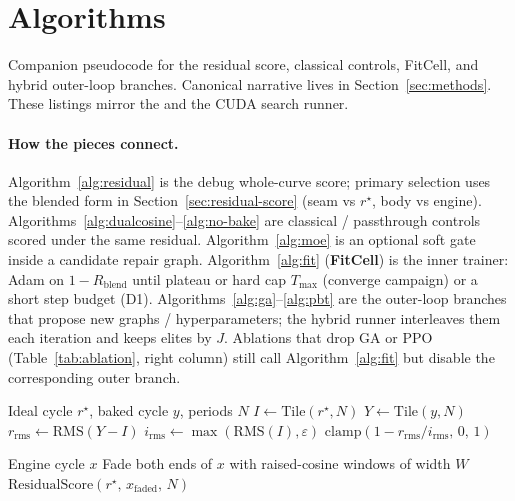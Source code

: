 \section{Algorithms}
\label{app:algorithms}

Companion pseudocode for the residual score, classical controls, FitCell, and hybrid outer-loop branches.
Canonical narrative lives in Section~\ref{sec:methods}.
These listings mirror the
and the CUDA search runner.

\paragraph{How the pieces connect.}
Algorithm~\ref{alg:residual} is the debug whole-curve score; primary selection uses the blended form in Section~\ref{sec:residual-score} (seam vs $r^{\star}$, body vs engine).
Algorithms~\ref{alg:dualcosine}--\ref{alg:no-bake} are classical / passthrough controls scored under the same residual.
Algorithm~\ref{alg:moe} is an optional soft gate inside a candidate repair graph.
Algorithm~\ref{alg:fit} (\textbf{FitCell}) is the inner trainer: Adam on $1-R_{\mathrm{blend}}$ until plateau or hard cap $T_{\max}$ (converge campaign) or a short step budget (D1).
Algorithms~\ref{alg:ga}--\ref{alg:pbt} are the outer-loop branches that propose new graphs / hyperparameters; the hybrid runner interleaves them each iteration and keeps elites by $J$.
Ablations that drop GA or PPO (Table~\ref{tab:ablation}, right column) still call Algorithm~\ref{alg:fit} but disable the corresponding outer branch.

\begin{algorithm}[H]
\caption{ResidualScore}
\label{alg:residual}
\begin{algorithmic}[1]
\Require Ideal cycle $r^{\star}$, baked cycle $y$, periods $N$
\State $I \gets \mathrm{Tile}(r^{\star}, N)$
\State $Y \gets \mathrm{Tile}(y, N)$
\State $r_{\mathrm{rms}} \gets \mathrm{RMS}(Y-I)$
\State $i_{\mathrm{rms}} \gets \max(\mathrm{RMS}(I), \varepsilon)$
\State \Return $\mathrm{clamp}(1 - r_{\mathrm{rms}}/i_{\mathrm{rms}},\,0,\,1)$
\end{algorithmic}
\end{algorithm}

\begin{algorithm}[H]
\caption{DualCosine baseline}
\label{alg:dualcosine}
\begin{algorithmic}[1]
\Require Engine cycle $x$
\State Fade both ends of $x$ with raised-cosine windows of width $W$
\State \Return $\mathrm{ResidualScore}(r^{\star},\,x_{\mathrm{faded}},\,N)$
\end{algorithmic}
\end{algorithm}

